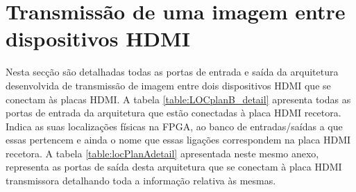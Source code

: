 %

\section{Transmissão de uma imagem entre dispositivos HDMI} \label{ap3:imagem_RX_TX}
%
Nesta secção são detalhadas todas as portas de entrada e saída da arquitetura desenvolvida de transmissão de imagem entre dois dispositivos HDMI que se conectam às placas HDMI. 
%
A tabela \ref{table:LOCplanB_detail} apresenta todas as portas de entrada da arquitetura que estão conectadas à placa HDMI recetora. Indica as suas localizações físicas na FPGA, ao banco de entradas/saídas a que essas pertencem e ainda o nome que essas ligações correspondem na placa HDMI recetora. A tabela \ref{table:locPlanAdetail} apresentada neste mesmo anexo, representa as portas de saída desta arquitetura que se conectam à placa HDMI transmissora detalhando toda a informação relativa às mesmas.


